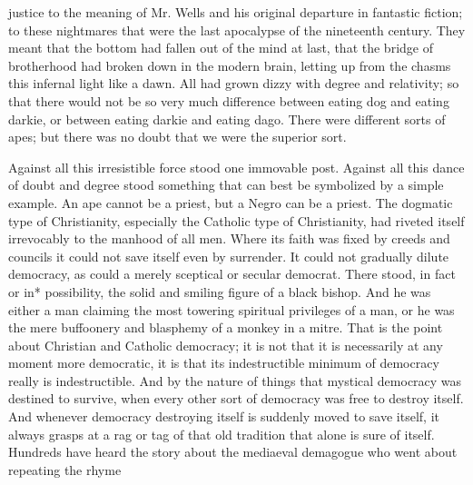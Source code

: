 \documentclass{book}
\begin{document}
justice to the meaning of Mr. Wells and his original departure in fantastic fiction; to these nightmares that were the last apocalypse of the nineteenth century. They meant that the bottom had fallen out of the mind at last, that the bridge of brotherhood had broken down in the modern brain, letting up from the chasms this infernal light like a dawn. All had grown dizzy with degree and relativity; so that there would not be so very much difference between eating dog and eating darkie, or between eating darkie and eating dago. There were different sorts of apes; but there was no doubt that we were the superior sort.

Against all this irresistible force stood one immovable post. Against all this dance of doubt and degree stood something that can best be symbolized by a simple example. An ape cannot be a priest, but a Negro can be a priest. The dogmatic type of Christianity, especially the Catholic type of Christianity, had riveted itself irrevocably to the manhood of all men. Where its faith was fixed by creeds and councils it could not save itself even by surrender. It could not gradually dilute democracy, as could a merely sceptical or secular democrat. There stood, in fact or in* possibility, the solid and smiling figure of a black bishop. And he was either a man claiming the most towering spiritual privileges of a man, or he was the mere buffoonery and blasphemy of a monkey in a mitre. That is the point about Christian and Catholic democracy; it is not that it is necessarily at any moment more democratic, it is that its indestructible minimum of democracy really is indestructible. And by the nature of things that mystical democracy was destined to survive, when every other sort of democracy was free to destroy itself. And whenever democracy destroying itself is suddenly moved to save itself, it always grasps at a rag or tag of that old tradition that alone is sure of itself. Hundreds have heard the story about the mediaeval demagogue who went about repeating the rhyme
\end{document}
